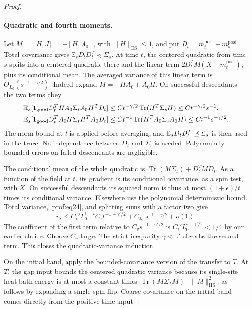 \begin{proof}
\paragraph{Quadratic and fourth moments.}
Let \(M=[H,J]=-[H,A_0]\), with \(\|H\|_{\mathrm{HS}}\le1\), and
put \(D_t=m_t^{\mathrm{post}}-m_s^{\mathrm{post}}\).  Total covariance
gives \(\mathbb E_sD_tD_t^T\preceq\Sigma_s\).  At time \(t\),
the centered quadratic from time \(s\) splits into a centered quadratic
there and the linear term
\(2D_t^TM(X-m_t^{\mathrm{post}})\), plus its conditional mean.
The averaged variance of this linear term is
\(O_{L_0}(s^{-1-\gamma/2})\). Indeed expand
\(M=-HA_0+A_0H\). On successful descendants the two terms obey
\[
\begin{split}
 \mathbb E_s[\mathbf1_{\rm good}D_t^THA_0\Sigma_tA_0H^TD_t]
 &\le Ct^{-\gamma/2}\operatorname{Tr}(H^T\Sigma_sH)
 \le Ct^{-\gamma/2}s^{-1},\\
 \mathbb E_s[\mathbf1_{\rm good}D_t^TA_0H\Sigma_tH^TA_0D_t]
 &\le Ct^{-1}\operatorname{Tr}(H^TA_0\Sigma_sA_0H)
 \le Ct^{-1}s^{-\gamma/2}.
\end{split}
\]
The norm bound at \(t\) is applied before averaging, and
\(\mathbb E_sD_tD_t^T\preceq\Sigma_s\) is then used in the trace.
No independence between \(D_t\) and \(\Sigma_t\) is needed.
Polynomially bounded errors on failed descendants are negligible.

The conditional mean of the whole quadratic is
\(\operatorname{Tr}(M\Sigma_t)+D_t^TMD_t\).  As a function of the
field at \(t\), its gradient is its conditional covariance, as a spin
test, with \(X\).  On successful descendants its squared norm is thus
at most \((1+\epsilon)/t\) times its conditional variance.  Elsewhere
use the polynomial deterministic bound.  Total variance,
\eqref{prof:eq24}, and splitting sums with a factor two give
\[
 v_s\le C_\iota' L_0^{1+\iota}C_vt^{-1-\gamma'/2}
           +C_{L_0}s^{-1-\gamma/2}+o(1).
\]
The coefficient of the first term relative to
\(C_vs^{-1-\gamma'/2}\) is
\(C_\iota'L_0^{\iota-\gamma'/2}<1/4\) by our earlier choice.
Choose \(C_v\) large. The strict
inequality \(\gamma<\gamma'\) absorbs the second term.  This closes
the quadratic-variance induction.

On the initial band, apply the bounded-covariance version of the transfer
to \(T\).  At \(T\), the gap input bounds the centered quadratic
variance because its single-site heat-bath energy is at most a constant
times
\(\operatorname{Tr}(M\Sigma_TM)+\|M\|_{\mathrm{HS}}^2\),
as follows by expanding a single spin flip.  Coarse covariance on the
initial band comes directly from the positive-time input.


\end{proof}
